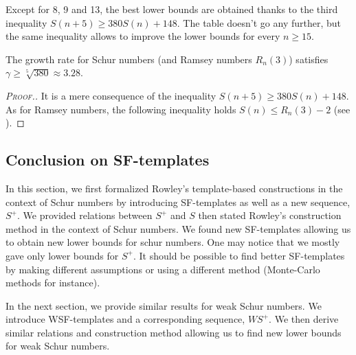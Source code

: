 Except for 8, 9 and 13, the best lower bounds are obtained thanks to
the third inequality \( S(n+5) \geqslant 380S(n) + 148\). The table
doesn't go any further, but the same inequality allows to improve the
lower bounds for every \( n \geqslant 15 \).

\begin{corollary}
The growth rate for Schur numbers (and Ramsey numbers \(R_n(3)\))  satisfies \(\gamma \geqslant \sqrt[5]{380} \approx 3.28\).
\end{corollary}

\begin{proof}[\textsc{Proof.}]
It is a mere consequence of the inequality \( S(n+5) \geqslant 380S(n) + 148\). As for Ramsey
numbers, the following inequality holds \(S(n) \leqslant R_n(3) - 2\) (see \cite{AbbottHanson}).
\end{proof}


\subsection{Conclusion on SF-templates}

\qquad In this section, we first formalized Rowley's template-based constructions \cite{RowleyRamsey} in the context of Schur numbers 
by introducing SF-templates as well as a new sequence, \(S^+\). We provided relations between \(S^+\) and \(S\) then 
stated Rowley's construction method in the context of Schur numbers. We found new SF-templates allowing us to obtain 
new lower bounds for schur numbers. One may notice that we mostly gave only lower bounds for \(S^+\). It should be possible to 
find better SF-templates by making different assumptions or using a different method (Monte-Carlo methods for instance).

\par
In the next section, we provide similar results for weak Schur numbers. We introduce WSF-templates and a corresponding sequence, 
\(WS^+\). We then derive similar relations and construction method allowing us to find new lower bounds for weak Schur numbers.
